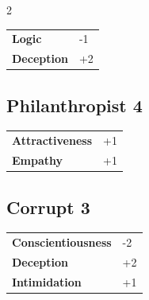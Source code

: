 \begin{multicols}{2}
\begin{tcolorbox}
\begin{tabular}{@{}ll@{}}
    \textbf{Logic} & -1\\
    \textbf{Deception} & +2\\
\end{tabular}


\end{tcolorbox}

\begin{tcolorbox}
    \subsection*{Philanthropist \hfill \small{4 }}
    \tcblower




\begin{tabular}{@{}ll@{}}
    \textbf{Attractiveness} & +1\\
    \textbf{Empathy} & +1\\
\end{tabular}


\end{tcolorbox}

\begin{tcolorbox}
    \subsection*{Corrupt \hfill \small{3 }}
    \tcblower




\begin{tabular}{@{}ll@{}}
    \textbf{Conscientiousness} & -2\\
    \textbf{Deception} & +2\\
    \textbf{Intimidation} & +1\\
\end{tabular}


\end{tcolorbox}


\end{multicols}
